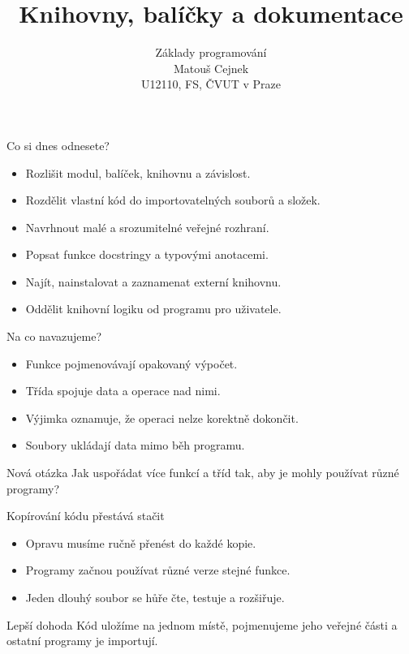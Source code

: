 \documentclass[aspectratio=169]{beamer}
\title{Knihovny, balíčky a dokumentace}
\subtitle{Základy programování\\Matouš Cejnek\\U12110, FS, ČVUT v Praze}
\author{} \institute{} \date{}
\begin{document}
\begin{frame}
  \clearpage\thispagestyle{empty}\titlepage
\end{frame}

\begin{frame}{Co si dnes odnesete?}
  \begin{itemize}
    \item Rozlišit modul, balíček, knihovnu a závislost.
    \item Rozdělit vlastní kód do importovatelných souborů a složek.
    \item Navrhnout malé a srozumitelné veřejné rozhraní.
    \item Popsat funkce docstringy a typovými anotacemi.
    \item Najít, nainstalovat a zaznamenat externí knihovnu.
    \item Oddělit knihovní logiku od programu pro uživatele.
  \end{itemize}
\end{frame}

\begin{frame}{Na co navazujeme?}
  \begin{itemize}
    \item Funkce pojmenovávají opakovaný výpočet.
    \item Třída spojuje data a operace nad nimi.
    \item Výjimka oznamuje, že operaci nelze korektně dokončit.
    \item Soubory ukládají data mimo běh programu.
  \end{itemize}
  \begin{block}{Nová otázka}
    Jak uspořádat více funkcí a tříd tak, aby je mohly používat různé programy?
  \end{block}
\end{frame}

\begin{frame}{Kopírování kódu přestává stačit}
  \begin{itemize}
    \item Opravu musíme ručně přenést do každé kopie.
    \item Programy začnou používat různé verze stejné funkce.
    \item Jeden dlouhý soubor se hůře čte, testuje a rozšiřuje.
  \end{itemize}
  \begin{block}{Lepší dohoda}
    Kód uložíme na jednom místě, pojmenujeme jeho veřejné části a ostatní programy je importují.
  \end{block}
\end{frame}
\end{document}
